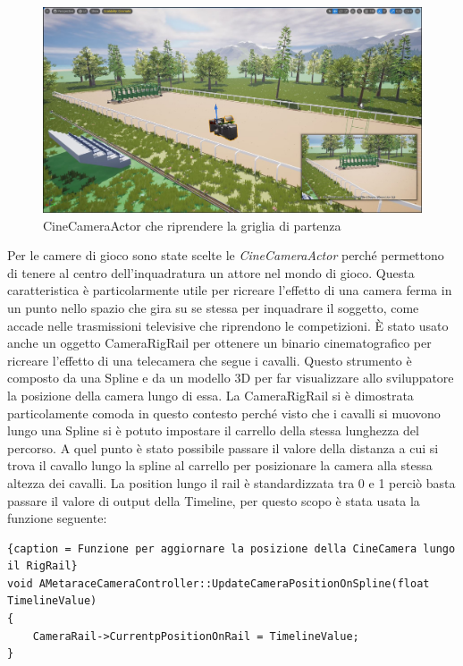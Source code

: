     \begin{figure}[!ht]\label{img:CineCameraActor}
        \centering
        \includegraphics[width=12cm]{figure/CameraActor.JPG}
        \caption{CineCameraActor che riprendere la griglia di partenza}
    \end{figure}

    Per le camere di gioco sono state scelte le \textit{CineCameraActor} perché permettono di tenere al centro dell'inquadratura un attore nel mondo di gioco.
    Questa caratteristica è particolarmente utile per ricreare l'effetto di una camera ferma in un punto nello spazio che gira su se stessa per inquadrare il soggetto, come accade nelle trasmissioni televisive che riprendono le competizioni.
    È stato usato anche un oggetto CameraRigRail per ottenere un binario cinematografico per ricreare l'effetto di una telecamera che segue i cavalli.
    Questo strumento è composto da una Spline e da un modello 3D per far visualizzare allo sviluppatore la posizione della camera lungo di essa.
    La CameraRigRail si è dimostrata particolamente comoda in questo contesto perché visto che i cavalli si muovono lungo una Spline si è potuto impostare il carrello della stessa lunghezza del percorso.
    A quel punto è stato possibile passare il valore della distanza a cui si trova il cavallo lungo la spline al carrello per posizionare la camera alla stessa altezza dei cavalli.
    La position lungo il rail è standardizzata tra 0 e 1 perciò basta passare il valore di output della Timeline, per questo scopo è stata usata la funzione seguente:

    \begin{lstlisting}{caption = Funzione per aggiornare la posizione della CineCamera lungo il RigRail}
void AMetaraceCameraController::UpdateCameraPositionOnSpline(float TimelineValue)
{
    CameraRail->CurrentpPositionOnRail = TimelineValue;
}
    \end{lstlisting}

